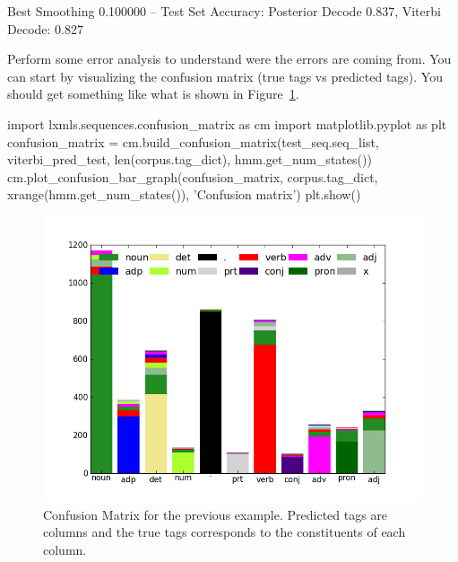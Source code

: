 \begin{exercise}
\begin{python}
Best Smoothing 0.100000 --  Test Set Accuracy: Posterior Decode 0.837, Viterbi Decode: 0.827
\end{python}


Perform some error analysis to understand were the errors are coming
from. You can start by visualizing the confusion matrix (true tags vs
predicted tags). You should get something like what is shown in Figure~\ref{fig:cmuns}.

\begin{python}
import lxmls.sequences.confusion_matrix as cm
import matplotlib.pyplot as plt
confusion_matrix = cm.build_confusion_matrix(test_seq.seq_list, viterbi_pred_test, len(corpus.tag_dict), hmm.get_num_states())
cm.plot_confusion_bar_graph(confusion_matrix, corpus.tag_dict, xrange(hmm.get_num_states()), 'Confusion matrix')
plt.show()
\end{python}

\begin{figure}[h!]
\centering
\includegraphics[scale=.4]{figs/sequences/cm_sup.png}
\caption{\label{fig:cmuns} Confusion Matrix for the previous
  example. Predicted tags are columns and the true tags corresponds to
  the constituents of each column.}
\end{figure}

\end{exercise}


%
%

